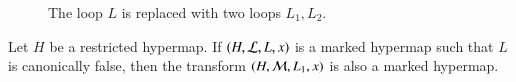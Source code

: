 \begin{figure}[htb]
\centering
{}
\caption{The loop $L$ is replaced with two loops $L_1, L_2$.}
\label{fig:L1L2}
\end{figure}





\begin{lemma} 
Let $H$ be a restricted hypermap.
If $(H,{\cal L},L,x)$ is a marked hypermap such that $L$
is canonically false,  then the transform
$(H,{\cal M},L_1,x)$ 
is also a marked hypermap.
\end{lemma}

